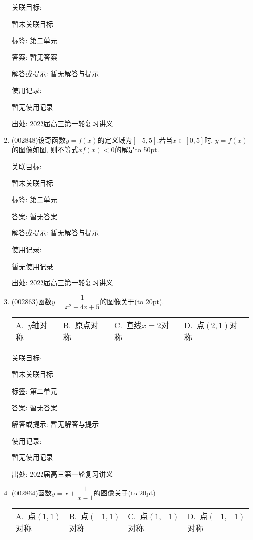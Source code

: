 \documentclass[10pt,a4paper]{article}
\newcommand{\blank}[1]{\underline{\hbox to #1pt{}}}
\newcommand{\bracket}[1]{(\hbox to #1pt{})}
\newcommand{\fourch}[4]{\par\begin{tabular}{p{.23\textwidth}p{.23\textwidth}p{.23\textwidth}p{.23\textwidth}}
A.~#1 &B.~#2& C.~#3& D.~#4
\end{tabular}}
\begin{document}
\begin{enumerate}[1.]
关联目标:

暂未关联目标



标签: 第二单元

答案: 暂无答案

解答或提示: 暂无解答与提示

使用记录:

暂无使用记录


出处: 2022届高三第一轮复习讲义
\item { (002848)}设奇函数$y=f(x)$的定义域为$[-5, 5]$.若当$x\in [0,5]$时, $y=f(x)$的图像如图, 则不等式$xf(x)<0$的解是\blank{50}.
\begin{center}
\end{center}


关联目标:

暂未关联目标



标签: 第二单元

答案: 暂无答案

解答或提示: 暂无解答与提示

使用记录:

暂无使用记录


出处: 2022届高三第一轮复习讲义
\item { (002863)}函数$y=\dfrac 1{x^2-4x+5}$的图像关于\bracket{20}.
\fourch{$y$轴对称}{原点对称}{直线$x=2$对称}{点$(2,1)$对称}


关联目标:

暂未关联目标



标签: 第二单元

答案: 暂无答案

解答或提示: 暂无解答与提示

使用记录:

暂无使用记录


出处: 2022届高三第一轮复习讲义
\item { (002864)}函数$y=x+\dfrac 1{x-1}$的图像关于\bracket{20}.
\fourch{点$(1,1)$对称}{点$(-1,1)$对称}{点$(1,-1)$对称}{点$(-1,-1)$对称}



\end{enumerate}
\end{document}
